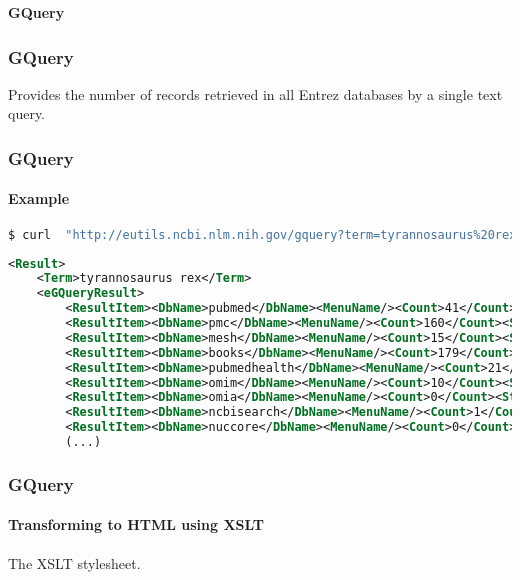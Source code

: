 \documentclass{beamer}
\newcommand{\centeredtitle}[1]{
\begin{center}
    \Huge{\bf{#1}}
\end{center}
}
\newcommand{\hugeslide}[1]{
\begin{frame}
\centeredtitle{#1}
\end{frame}
}
\begin{document}
\hugeslide{GQuery}


\begin{frame}[fragile]
\frametitle{GQuery}
Provides the number of records retrieved in all Entrez databases by a single text query.
\end{frame}



\begin{frame}[fragile]
\frametitle{GQuery}
\framesubtitle{Example}
\begin{lstlisting}[language=bash,basicstyle=\tiny,breaklines=true,escapechar=\!]
$ curl  "http://eutils.ncbi.nlm.nih.gov/gquery?term=tyrannosaurus%20rex&retmode=xml"
\end{lstlisting}

\begin{lstlisting}[language=xml,basicstyle=\tiny,breaklines=true,escapechar=\%]
<Result>
    <Term>tyrannosaurus rex</Term>
    <eGQueryResult>
        <ResultItem><DbName>pubmed</DbName><MenuName/><Count>41</Count><Status>Ok</Status></ResultItem>
        <ResultItem><DbName>pmc</DbName><MenuName/><Count>160</Count><Status>Ok</Status></ResultItem>
        <ResultItem><DbName>mesh</DbName><MenuName/><Count>15</Count><Status>Ok</Status></ResultItem>
        <ResultItem><DbName>books</DbName><MenuName/><Count>179</Count><Status>Ok</Status></ResultItem>
        <ResultItem><DbName>pubmedhealth</DbName><MenuName/><Count>21</Count><Status>Ok</Status></ResultItem>
        <ResultItem><DbName>omim</DbName><MenuName/><Count>10</Count><Status>Ok</Status></ResultItem>
        <ResultItem><DbName>omia</DbName><MenuName/><Count>0</Count><Status>Term or Database is not found</Status></ResultItem>
        <ResultItem><DbName>ncbisearch</DbName><MenuName/><Count>1</Count><Status>Ok</Status></ResultItem>
        <ResultItem><DbName>nuccore</DbName><MenuName/><Count>0</Count><Status>Term or Database is not found</Status></ResultItem>
        (...)
\end{lstlisting}
\end{frame}


\begin{frame}[fragile]
\frametitle{GQuery}
\framesubtitle{Transforming to HTML using XSLT}
The XSLT stylesheet.

\end{frame}
\end{document}
